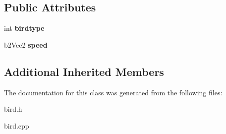 \subsection*{Public Attributes}
\begin{DoxyCompactItemize}
\item 
\hypertarget{classBird_a4143fb4247686a08dea090c2c0594c61}{int {\bfseries birdtype}}\label{classBird_a4143fb4247686a08dea090c2c0594c61}

\item 
\hypertarget{classBird_a8be58997abcdbc0dc33b65deae95a4a9}{b2\-Vec2 {\bfseries speed}}\label{classBird_a8be58997abcdbc0dc33b65deae95a4a9}

\end{DoxyCompactItemize}
\subsection*{Additional Inherited Members}


The documentation for this class was generated from the following files\-:\begin{DoxyCompactItemize}
\item 
bird.\-h\item 
bird.\-cpp\end{DoxyCompactItemize}
